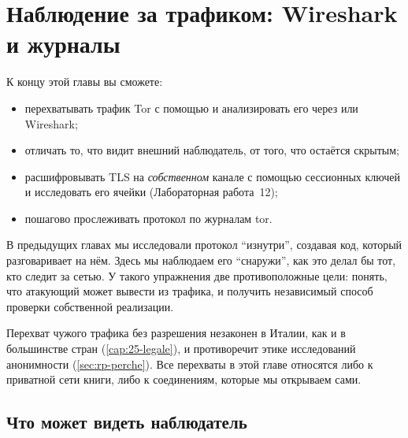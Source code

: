 \chapter{Наблюдение за трафиком: Wireshark и журналы}\label{cap:20-traffico}

\begin{obiettivi}
К концу этой главы вы сможете:
\begin{itemize}[nosep]
  \item перехватывать трафик Tor с помощью  и анализировать его через  или Wireshark;
  \item отличать то, что видит внешний наблюдатель, от того, что остаётся скрытым;
  \item расшифровывать TLS на \emph{собственном} канале с помощью сессионных ключей и исследовать его ячейки (Лабораторная работа~12);
  \item пошагово прослеживать протокол по журналам tor.
\end{itemize}
\end{obiettivi}

В предыдущих главах мы исследовали протокол \enquote{изнутри}, создавая код, который разговаривает на нём. Здесь мы наблюдаем его \enquote{снаружи}, как это делал бы тот, кто следит за сетью. У такого упражнения две противоположные цели: понять, что атакующий может вывести из трафика, и получить независимый способ проверки собственной реализации.

\begin{attenzione}
Перехват чужого трафика без разрешения незаконен в Италии, как и в большинстве стран (\cref{cap:25-legale}), и противоречит этике исследований анонимности (\cref{sec:rp-perche}). Все перехваты в этой главе относятся либо к приватной сети книги, либо к соединениям, которые мы открываем сами.
\end{attenzione}

\section{Что может видеть наблюдатель}\label{sec:traffico-osservatore}

